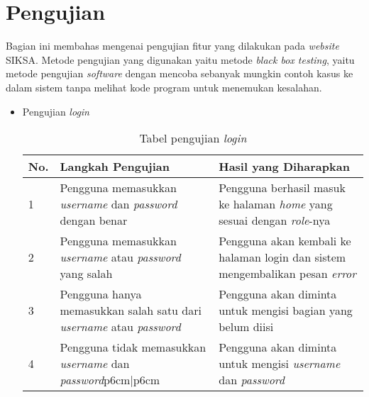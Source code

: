 \section{Pengujian}
\label{sec:pengujian}
Bagian ini membahas mengenai pengujian fitur yang dilakukan pada \textit{website} SIKSA. Metode pengujian yang digunakan yaitu metode \textit{black box testing}, yaitu metode pengujian \textit{software} dengan mencoba sebanyak mungkin contoh kasus ke dalam sistem tanpa melihat kode program untuk menemukan kesalahan.
\begin{itemize}
	\item Pengujian \textit{login}
	\begin{table}[H]
	\centering
	\caption{Tabel pengujian \textit{login}}
	\label{pengujian_login}
	\begin{tabular}{|l|p{6cm}|p{6cm}|}
	\hline
	\textbf{No.}&\textbf{Langkah Pengujian}&\textbf{Hasil yang Diharapkan}\\ \hline
	1&Pengguna memasukkan \textit{username} dan \textit{password} dengan benar&Pengguna berhasil masuk ke halaman \textit{home} yang sesuai dengan \textit{role}-nya \\ \hline
	2&Pengguna memasukkan \textit{username} atau \textit{password} yang salah &Pengguna akan kembali ke halaman login dan sistem mengembalikan pesan \textit{error}\\ \hline
	3&Pengguna hanya memasukkan salah satu dari \textit{username} atau \textit{password}&Pengguna akan diminta untuk mengisi bagian yang belum diisi\\ \hline
	4&Pengguna tidak memasukkan \textit{username} dan \textit{password}p{6cm}|p{6cm}&Pengguna akan diminta untuk mengisi \textit{username} dan \textit{password}\\ \hline
	\end{tabular}
	\end{table}	
	

\end{itemize}
